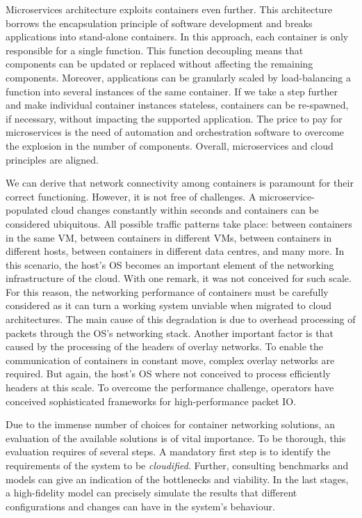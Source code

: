 \documentclass[conference]{IEEEtran}
\begin{document}
Microservices architecture exploits containers even further. This architecture borrows the encapsulation principle of software development and breaks applications into stand-alone containers. In this approach, each container is only responsible for a single function. This function decoupling means that components can be updated or replaced without affecting the remaining components. Moreover, applications can be granularly scaled by load-balancing a function into several instances of the same container. If we take a step further and make individual container instances stateless, containers can be re-spawned, if necessary, without impacting the supported application. The price to pay for microservices is the need of automation and orchestration software to overcome the explosion in the number of components. Overall, microservices and cloud principles are aligned.

We can derive that network connectivity among containers is paramount for their correct functioning.  However, it is not free of challenges. A microservice-populated cloud changes constantly within seconds and containers can be considered ubiquitous. All possible traffic patterns take place: between containers in the same VM, between containers in different VMs, between containers in different hosts, between containers in different data centres, and many more. In this scenario, the host's OS becomes an important element of the networking infrastructure of the cloud. With one remark, it was not conceived for such scale. For this reason, the networking performance of containers must be carefully considered as it can turn a working system unviable when migrated to cloud architectures. The main cause of this degradation is due to overhead processing of packets through the OS's networking stack. Another important factor is that caused by the processing of the headers of overlay networks. To enable the communication of containers in constant move, complex overlay networks are required. But again, the host's OS where not conceived to process efficiently headers at this scale. To overcome the performance challenge, operators have conceived sophisticated frameworks for high-performance packet IO.

Due to the immense number of choices for container networking solutions, an evaluation of the available solutions is of vital importance. To be thorough, this evaluation requires of several steps. A mandatory first step is to identify the requirements of the system to be \textit{cloudified}. Further, consulting benchmarks and models can give an indication of the bottlenecks and viability. In the last stages, a high-fidelity model can precisely simulate the results that different configurations and changes can have in the system's behaviour.\\
\end{document}
